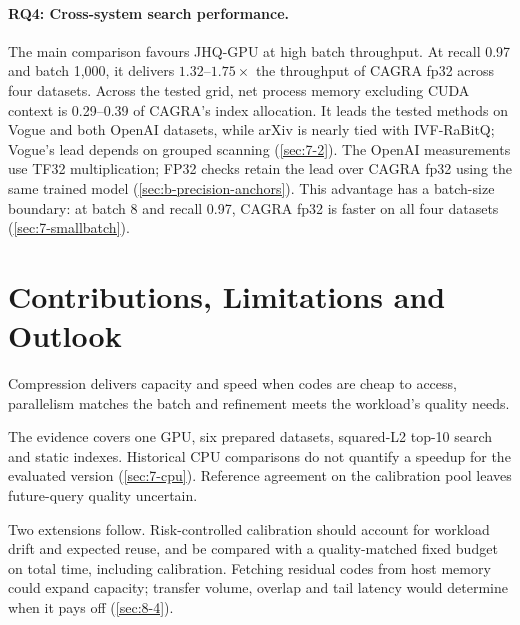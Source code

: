\paragraph{RQ4: Cross-system search performance.}
The main comparison favours JHQ-GPU at high batch throughput. At recall
0.97 and batch 1,000, it delivers $1.32$--$1.75\times$ the throughput of
CAGRA fp32 across four datasets. Across the tested grid, net process memory excluding CUDA context is
0.29--0.39 of CAGRA's index allocation. It leads the tested methods on Vogue and
both OpenAI datasets, while arXiv is nearly tied with IVF-RaBitQ;
Vogue's lead depends on grouped scanning (\cref{sec:7-2}). The OpenAI
measurements use TF32 multiplication; FP32 checks retain the lead over
CAGRA fp32 using the same trained model
(\cref{sec:b-precision-anchors}). This advantage has a batch-size boundary:
at batch 8 and recall 0.97, CAGRA fp32 is faster on all four datasets
(\cref{sec:7-smallbatch}).

\section{Contributions, Limitations and Outlook}
\label{sec:9-2}

Compression delivers capacity and speed when codes are cheap to access,
parallelism matches the batch and refinement meets the workload's
quality needs.

The evidence covers one GPU, six prepared datasets, squared-L2 top-10
search and static indexes. Historical CPU comparisons do not quantify a
speedup for the evaluated version (\cref{sec:7-cpu}). Reference agreement
on the calibration pool leaves future-query quality uncertain.

Two extensions follow. Risk-controlled calibration should account for
workload drift and expected reuse, and be compared with a quality-matched
fixed budget on total time, including calibration. Fetching residual
codes from host memory could expand capacity; transfer volume, overlap
and tail latency would determine when it pays off (\cref{sec:8-4}).
